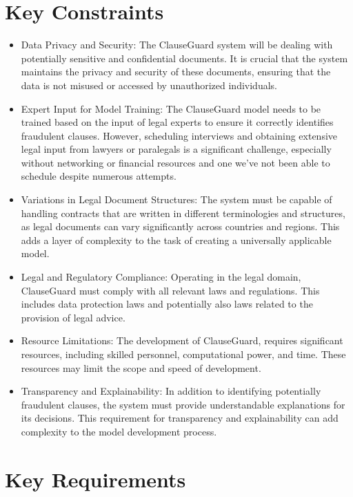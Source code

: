 \section{Key Constraints \cite{DMuresanUserreq} \label{Section::Key Constraints} }

\begin{itemize}
    \item Data Privacy and Security: The ClauseGuard system will be dealing with potentially sensitive and confidential documents. It is crucial that the system maintains the privacy and security of these documents, ensuring that the data is not misused or accessed by unauthorized individuals.
    \item Expert Input for Model Training: The ClauseGuard model needs to be trained based on the input of legal experts to ensure it correctly identifies fraudulent clauses. However, scheduling interviews and obtaining extensive legal input from lawyers or paralegals is a significant challenge, especially without networking or financial resources and one we've not been able to schedule despite numerous attempts.
    \item Variations in Legal Document Structures: The system must be capable of handling contracts that are written in different terminologies and structures, as legal documents can vary significantly across countries and regions. This adds a layer of complexity to the task of creating a universally applicable model.
    \item Legal and Regulatory Compliance: Operating in the legal domain, ClauseGuard must comply with all relevant laws and regulations. This includes data protection laws and potentially also laws related to the provision of legal advice.
    \item Resource Limitations: The development of ClauseGuard, requires significant resources, including skilled personnel, computational power, and time. These resources may limit the scope and speed of development.
    \item  Transparency and Explainability: In addition to identifying potentially fraudulent clauses, the system must provide understandable explanations for its decisions. This requirement for transparency and explainability can add complexity to the model development process.
    \end{itemize}

\section{Key Requirements \cite{DMuresanBusinessreq} \label{Section::Key Requirements}}

